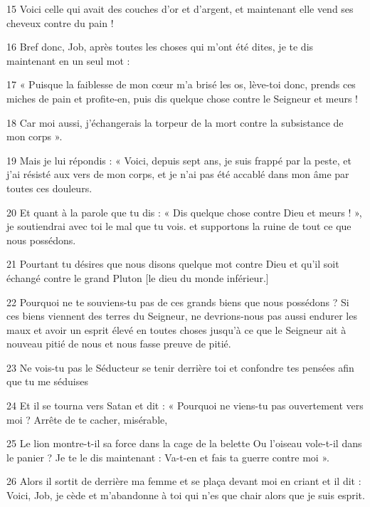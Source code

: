 \par 15 Voici celle qui avait des couches d'or et d'argent, et maintenant elle vend ses cheveux contre du pain !

\par 16 Bref donc, Job, après toutes les choses qui m'ont été dites, je te dis maintenant en un seul mot :

\par 17 « Puisque la faiblesse de mon cœur m'a brisé les os, lève-toi donc, prends ces miches de pain et profite-en, puis dis quelque chose contre le Seigneur et meurs !

\par 18 Car moi aussi, j'échangerais la torpeur de la mort contre la subsistance de mon corps ».

\par 19 Mais je lui répondis : « Voici, depuis sept ans, je suis frappé par la peste, et j'ai résisté aux vers de mon corps, et je n'ai pas été accablé dans mon âme par toutes ces douleurs.

\par 20 Et quant à la parole que tu dis : « Dis quelque chose contre Dieu et meurs ! », je soutiendrai avec toi le mal que tu vois. et supportons la ruine de tout ce que nous possédons.

\par 21 Pourtant tu désires que nous disons quelque mot contre Dieu et qu'il soit échangé contre le grand Pluton [le dieu du monde inférieur.]

\par 22 Pourquoi ne te souviens-tu pas de ces grands biens que nous possédons ? Si ces biens viennent des terres du Seigneur, ne devrions-nous pas aussi endurer les maux et avoir un esprit élevé en toutes choses jusqu'à ce que le Seigneur ait à nouveau pitié de nous et nous fasse preuve de pitié.

\par 23 Ne vois-tu pas le Séducteur se tenir derrière toi et confondre tes pensées afin que tu me séduises

\par 24 Et il se tourna vers Satan et dit : « Pourquoi ne viens-tu pas ouvertement vers moi ? Arrête de te cacher, misérable,

\par 25 Le lion montre-t-il sa force dans la cage de la belette Ou l'oiseau vole-t-il dans le panier ? Je te le dis maintenant : Va-t-en et fais ta guerre contre moi ».

\par 26 Alors il sortit de derrière ma femme et se plaça devant moi en criant et il dit : Voici, Job, je cède et m'abandonne à toi qui n'es que chair alors que je suis esprit.

